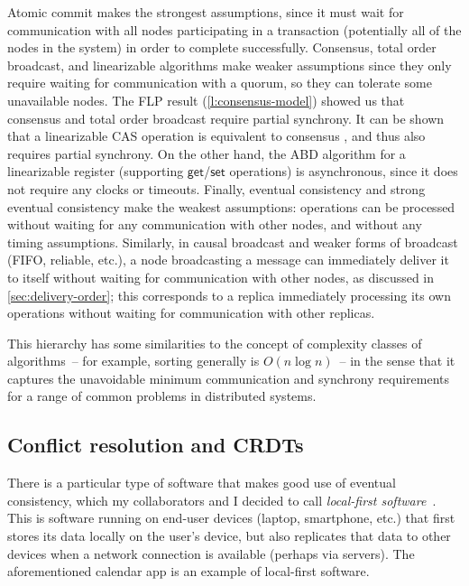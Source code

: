 Atomic commit makes the strongest assumptions, since it must wait for communication with all nodes participating in a transaction (potentially all of the nodes in the system) in order to complete successfully.
Consensus, total order broadcast, and linearizable algorithms make weaker assumptions since they only require waiting for communication with a quorum, so they can tolerate some unavailable nodes.
The FLP result (\autoref{l:consensus-model}) showed us that consensus and total order broadcast require partial synchrony.
It can be shown that a linearizable CAS operation is equivalent to consensus \citep{Herlihy:1991}, and thus also requires partial synchrony.
On the other hand, the ABD algorithm for a linearizable register (supporting $\mathsf{get}$/$\mathsf{set}$ operations) is asynchronous, since it does not require any clocks or timeouts.
Finally, eventual consistency and strong eventual consistency make the weakest assumptions: operations can be processed without waiting for any communication with other nodes, and without any timing assumptions.
Similarly, in causal broadcast and weaker forms of broadcast (FIFO, reliable, etc.), a node broadcasting a message can immediately deliver it to itself without waiting for communication with other nodes, as discussed in \autoref{sec:delivery-order}; this corresponds to a replica immediately processing its own operations without waiting for communication with other replicas.

This hierarchy has some similarities to the concept of complexity classes of algorithms~-- for example, sorting generally is $O(n \log n)$~-- in the sense that it captures the unavoidable minimum communication and synchrony requirements for a range of common problems in distributed systems.

\subsection{Conflict resolution and CRDTs}\label{sec:collaboration}

There is a particular type of software that makes good use of eventual consistency, which my collaborators and I decided to call \emph{local-first software}~\citep{Kleppmann:2019}.
This is software running on end-user devices (laptop, smartphone, etc.) that first stores its data locally on the user's device, but also replicates that data to other devices when a network connection is available (perhaps via servers).
The aforementioned calendar app is an example of local-first software.

